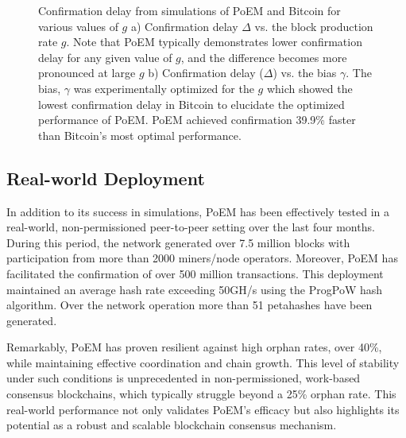 \begin{figure}
\begin{subfigure}{0.49\textwidth}
    \label{fig:fg}
    \end{subfigure}
    \caption{Confirmation delay from simulations of PoEM and Bitcoin for various values of $g$ a) Confirmation delay $\Delta$ vs. the block production rate $g$. Note that PoEM typically demonstrates lower confirmation delay for any given value of $g$, and the difference becomes more pronounced at large $g$ b) Confirmation delay ($\Delta$) vs. the bias $\gamma$. The bias, $\gamma$ was experimentally optimized for the $g$ which showed the lowest confirmation delay in Bitcoin to elucidate the optimized performance of PoEM. PoEM achieved confirmation 39.9\% faster than Bitcoin's most optimal performance.}
    \label{fig:gamma}
\end{figure}

\subsection{Real-world Deployment} 
In addition to
its success in simulations, PoEM has been effectively tested in a real-world,
non-permissioned peer-to-peer setting over the last four months. During this
period, the network generated over 7.5 million blocks with participation from
more than 2000 miners/node operators. Moreover, PoEM has facilitated the
confirmation of over 500 million transactions. This deployment maintained an
average hash rate exceeding 50GH/s using the ProgPoW hash algorithm. Over the
network operation more than 51 petahashes have been generated.

Remarkably, PoEM has proven resilient against high orphan rates, over 40\%,
while maintaining effective coordination and chain growth. This level of
stability under such conditions is unprecedented in non-permissioned,
work-based consensus blockchains, which typically struggle beyond a 25\% orphan
rate. This real-world performance not only validates PoEM's efficacy but also
highlights its potential as a robust and scalable blockchain consensus
mechanism.

